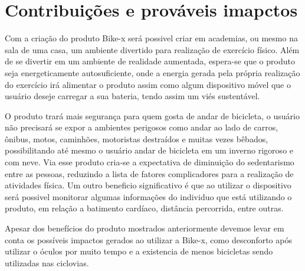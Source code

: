 \chapter[Impactos]{Contribuições e prováveis imapctos}

Com a criação do produto Bike-x será possivel criar em academias, ou mesmo na sala de uma casa, um ambiente divertido para realização de exercício físico. Além de se divertir em um ambiente de realidade aumentada, espera-se que o produto seja energeticamente autosuficiente, onde a energia gerada pela própria realização do exercício irá alimentar o produto assim como algum dispositivo móvel que o usuário deseje carregar a sua bateria, tendo assim um viés sustentável.  

O produto trará mais segurança para quem gosta de andar de bicicleta, o usuário não precisará se expor a ambientes perigosos como andar ao lado de carros, ônibus, motos, caminhões, motoristas destraídos e muitas vezes bêbados, possibilitando até mesmo o usuário andar de bicicleta em um inverno rigoroso e com neve. Via esse produto cria-se a expectativa de diminuição do sedentarismo entre as pessoas, reduzindo a lista de fatores complicadores para a realização de atividades física. Um outro beneficio significativo é que ao utilizar o dispositivo será possivel monitorar algumas informações do individuo que está utilizando o produto, em relação a batimento cardíaco, distância percorrida, entre outras.

Apesar dos benefícios do produto mostrados anteriormente devemos levar em conta os possíveis impactos gerados ao utilizar a Bike-x, como desconforto após utilizar o óculos por muito tempo e a existencia de menos bicicletas sendo utilizadas nas ciclovias.
